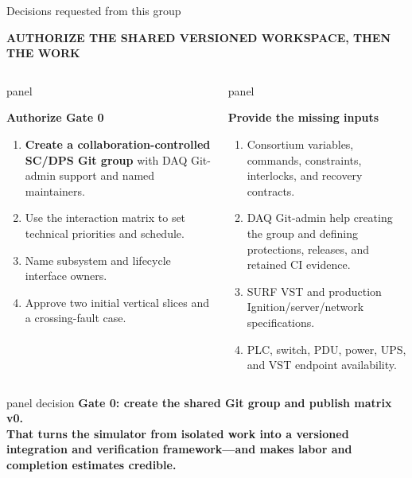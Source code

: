 \documentclass[aspectratio=169,10pt]{beamer}
\newcommand{\eyebrow}[1]{{\color{noircyan}\scriptsize\bfseries #1\par}}
\newcommand{\tightitem}{%
  \setlength{\itemsep}{0.8mm}%
  \setlength{\parskip}{0pt}%
}
\newcommand{\fixedpanel}[4][panel]{%
  \begin{beamercolorbox}[wd=\linewidth,sep=4pt,rounded=true]{#1}
    \begin{minipage}[t][#2][t]{\dimexpr\linewidth-8pt\relax}
      \raggedright
      {\usebeamercolor[fg]{#1}\bfseries #3\par}
      \vspace{0.45mm}
      {\usebeamercolor[fg]{#1}\footnotesize #4\par}
    \end{minipage}
  \end{beamercolorbox}
}
\begin{document}
\begin{frame}[t]{Decisions requested from this group}
\eyebrow{AUTHORIZE THE SHARED VERSIONED WORKSPACE, THEN THE WORK}
\vspace{1.0mm}

\begin{columns}[T,onlytextwidth]
\fixedpanel{3.2cm}{Authorize Gate 0}{
\begin{enumerate}\tightitem
  \item \textbf{Create a collaboration-controlled SC/DPS Git group} with DAQ
    Git-admin support and named maintainers.
  \item Use the interaction matrix to set technical priorities and schedule.
  \item Name subsystem and lifecycle interface owners.
  \item Approve two initial vertical slices and a crossing-fault case.
\end{enumerate}
}

\fixedpanel{3.2cm}{Provide the missing inputs}{
\begin{enumerate}\tightitem
  \item Consortium variables, commands, constraints, interlocks, and recovery contracts.
  \item DAQ Git-admin help creating the group and defining protections,
    releases, and retained CI evidence.
  \item SURF VST and production Ignition/server/network specifications.
  \item PLC, switch, PDU, power, UPS, and VST endpoint availability.
\end{enumerate}
}
\end{columns}

\vspace{1mm}
\begin{beamercolorbox}[wd=\linewidth,sep=6pt,rounded=true]{panel decision}
\centering
\color{noirbg}\bfseries\fontsize{11}{13}\selectfont
Gate 0: create the shared Git group and publish matrix v0.\\
That turns the simulator from isolated work into a versioned integration and
verification framework---and makes labor and completion estimates credible.
\end{beamercolorbox}
\end{frame}

\appendix
\end{document}
